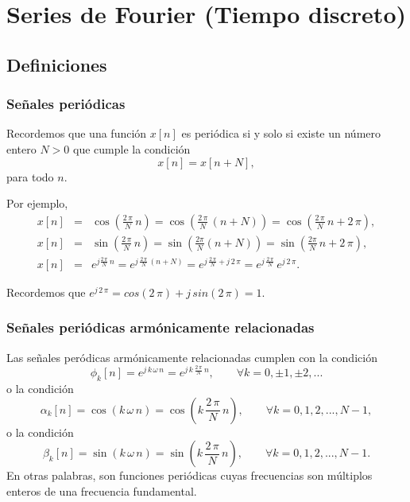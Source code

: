 \chapter{Series de Fourier (Tiempo discreto)}

\section{Definiciones}

\subsection{Señales periódicas}

Recordemos que una funci\'{o}n $x[n]$ es peri\'{o}dica si y solo si existe un n\'{u}mero entero $N > 0$
que cumple la condici\'{o}n
\begin{equation}
x\left[ n\right] =x\left[ n+N\right],
\end{equation}
para todo $n$. 

Por ejemplo, 
\begin{eqnarray}
x[n] &=&\cos (\frac{2 \, \pi }{N} \, n) = \cos(\frac{2 \, \pi}{N} \, (n + N)) = \cos (\frac{2 \, \pi}{N} \, n + 2 \, \pi),\\
x\left[ n\right] &=&\sin (\frac{2 \, \pi }{N} \, n) = 
\sin(\frac{2 \pi}{N} (n+N)) = \sin (\frac{2 \pi}{N} \, n + 2 \, \pi), \\
x\left[ n\right] &=&
e^{j\frac{2 \, \pi }{N} \, n} = 
e^{j \, \frac{2 \, \pi}{N} \, (n + N)} = 
e^{j \, \frac{2 \, \pi}{N} + j \, 2 \, \pi} = 
e^{j \, \frac{2 \, \pi}{N}} \, e^{j \, 2 \, \pi}. 
\end{eqnarray}

Recordemos que $e^{j \, 2 \, \pi} = cos(2 \, \pi) + j \, sin(2 \, \pi) = 1$.

\subsection{Se\~{n}ales peri\'{o}dicas arm\'{o}nicamente relacionadas}

Las se\~ {n}ales per\'{o}dicas arm\'{o}nicamente relacionadas cumplen con la condici\'{o}n
\begin{equation}
\phi _{k}\left[ n\right] =e^{j \, k \, \omega \, n}=e^{j \, k \, \frac{2 \, \pi }{N} \, n}, \qquad \forall k=0,\pm 1,\pm 2,...  \label{NHar}
\end{equation}
o la condici\'{o}n
\begin{equation}
\alpha _{k}\left[ n\right] =\cos \left( k \, \omega \, n\right) =
\cos \left(k \, \frac{2 \, \pi }{N} \, n\right), \qquad \forall k=0, 1, 2,..., N - 1, 
\end{equation}
o la condici\'{o}n
\begin{equation}
\beta _{k}\left[ n\right] =\sin \left( k \, \omega \, n\right) =
\sin \left( k \, \frac{2 \, \pi }{N} \, n\right), \qquad \forall k=0, 1, 2,..., N - 1.
\end{equation}
En otras palabras, son funciones peri\'{o}dicas cuyas frecuencias son m\'{u}ltiplos enteros de una frecuencia fundamental.

